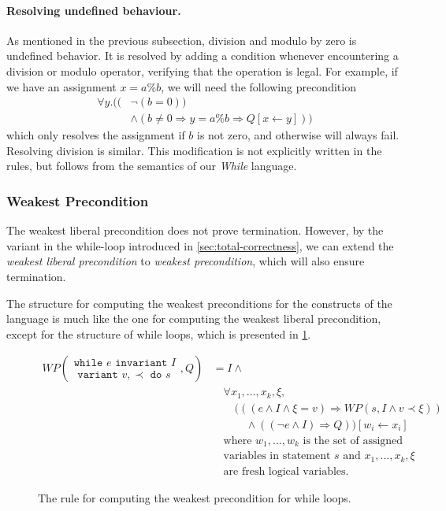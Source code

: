 \paragraph{Resolving undefined behaviour.}
As mentioned in the previous subsection, division and modulo by zero is undefined behavior.
It is resolved by adding a condition whenever encountering a division or modulo operator, verifying that the operation is legal.
For example, if we have an assignment $x = a \% b$, we will need the following precondition
\begin{align*}
\forall y . ( (&\neg (b = 0)) \\
                &\land (b \neq 0 \Rightarrow y = a \% b \Rightarrow Q[x \leftarrow y]))
\end{align*}
which only resolves the assignment if $b$ is not zero, and otherwise will always fail. Resolving division is similar.
This modification is not explicitly written in the rules, but follows from the semantics of our \textit{While} language.

\subsubsection{Weakest Precondition}
The weakest liberal precondition does not prove termination. However, by the variant in the while-loop introduced in \cref{sec:total-correctness}, we can extend the \textit{weakest liberal precondition} to \textit{weakest precondition}, which will also ensure termination.

The structure for computing the weakest preconditions for the constructs of the language is much like the one for computing the weakest liberal precondition, except for the structure of while loops, which is presented in \cref{fig:wp}.

\begin{figure}[h!]
\begin{align*}
WP\left(
    \begin{array}{c}
    \texttt{while } e \texttt{ invariant } I \\
    \texttt{ variant } v, \prec \texttt{ do } s
    \end{array}
, Q \right) 
&= 
    I \land \label{eq:wpwhile} \\
&\quad \forall x_1, ..., x_k, \xi, \\
&\quad \quad (((e \land I \land \xi = v) \Rightarrow WP(s, I \land v \prec \xi)) \\
&\quad \quad \quad \land ((\neg e \land I) \Rightarrow Q)) [w_i \leftarrow x_i] \\
&\quad \text{where } w_1, ..., w_k \text{ is the set of assigned} \\
&\quad \text{variables in statement } s \text{ and } x_1, ..., x_k, \xi \\
&\quad \text{are fresh logical variables.}
\end{align*}
\caption{The rule for computing the weakest precondition for while loops.}
\label{fig:wp}
\end{figure}

